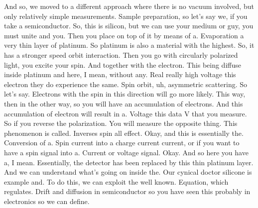 And so, we moved to a different approach where there is no vacuum involved, but only relatively simple measurements. Sample preparation, so let's say we, if you take a semiconductor. So, this is silicon, but we can use your medium or guy, you must unite and you. Then you place on top of it by means of a. Evaporation a very thin layer of platinum. So platinum is also a material with the highest. So, it has a stronger speed orbit interaction. Then you go with circularly polarized light, you excite your spin. And together with the electron. This being diffuse inside platinum and here, I mean, without any. Real really high voltage this electron they do experience the same. Spin orbit, uh, asymmetric scattering. So let's say. Electrons with the spin in this direction will go more likely. This way, then in the other way, so you will have an accumulation of electrons. And this accumulation of electron will result in a. Voltage this data V that you measure. So if you reverse the polarization. You will measure the opposite thing. This phenomenon is called. Inverses spin all effect. Okay, and this is essentially the. Conversion of a. Spin current into a charge current current, or if you want to have a spin signal into a. Current or voltage signal. Okay. And so here you have a, I mean. Essentially, the detector has been replaced by this thin platinum layer. And we can understand what's going on inside the. Our cynical doctor silicone is example and. To do this, we can exploit the well known. Equation, which regulates. Drift and diffusion in semiconductor so you have seen this probably in electronics so we can define.
